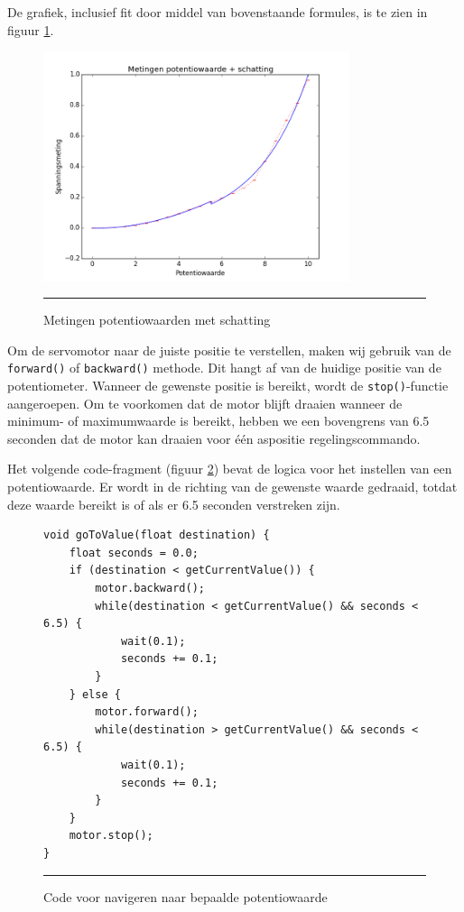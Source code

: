 \documentclass[a4paper,12pt]{article}
\begin{document}
De grafiek, inclusief fit door middel van bovenstaande formules, is te zien in figuur \ref{fig:fit}.
\vspace{1em}
\begin{figure}[!htbp]
\centering
\includegraphics[width=0.8\textwidth, scale=0.8]{plot-with-estimate.png}
\vspace{1ex}
\hrule
\caption{Metingen potentiowaarden met schatting}
\label{fig:fit}
\end{figure}

Om de servomotor naar de juiste positie te verstellen, maken wij gebruik van de \texttt{forward()} of \texttt{backward()} methode. Dit hangt af van de huidige positie van de potentiometer. Wanneer de gewenste positie is bereikt, wordt de \texttt{stop()}-functie aangeroepen. Om te voorkomen dat de motor blijft draaien wanneer de minimum- of maximumwaarde is bereikt, hebben we een bovengrens van 6.5 seconden dat de motor kan draaien voor \'{e}\'{e}n aspositie regelingscommando.

Het volgende code-fragment (figuur \ref{code:gotoValue}) bevat de logica voor het instellen van een potentiowaarde. Er wordt in de richting van de gewenste waarde gedraaid, totdat deze waarde bereikt is of als er 6.5 seconden verstreken zijn.
\begin{figure}
\begin{lstlisting}
void goToValue(float destination) {
    float seconds = 0.0;
    if (destination < getCurrentValue()) {
        motor.backward();
        while(destination < getCurrentValue() && seconds < 6.5) {
            wait(0.1);
            seconds += 0.1;
        }
    } else {
        motor.forward();
        while(destination > getCurrentValue() && seconds < 6.5) {
            wait(0.1);
            seconds += 0.1;
        }
    }
    motor.stop();
}
\end{lstlisting}
\vspace{1ex}
\hrule
\caption{Code voor navigeren naar bepaalde potentiowaarde}
\label{code:gotoValue}
\end{figure}
\end{document}
